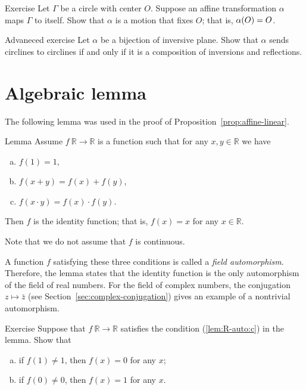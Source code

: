 \begin{thm}{Exercise}\label{ex:preserved-circle}
Let $\Gamma$ be a circle with center $O$.
Suppose an affine transformation $\alpha$ maps $\Gamma$ to itself.
Show that $\alpha$ is a motion that fixes $O$;
that is, $\alpha(O)=O$.
\end{thm}


\begin{thm}{Advaneced exercise}\label{ex:inversions-inversive}
Let $\alpha$ be a bijection of inversive plane.
Show that $\alpha$ sends circlines to circlines if and only if it is a composition of inversions and reflections.
\end{thm}



\section{Algebraic lemma}

The following lemma was used in the proof of Proposition~\ref{prop:affine-linear}.

\begin{thm}{Lemma}\label{lem:R-auto}
Assume $f\:\mathbb{R}\to\mathbb{R}$ is a function such that for any $x,y\in\mathbb{R}$ we have
\begin{enumerate}[(a)]
\item\label{lem:R-auto:a} $f(1)=1$,
\item\label{lem:R-auto:b} $f(x+y)=f(x)+f(y)$,
\item\label{lem:R-auto:c} $f(x\cdot y)=f(x)\cdot f(y)$.
\end{enumerate}

Then $f$ is the identity function; that is,
$f(x)=x$ for any $x\in \mathbb{R}$.
\end{thm}

Note that we do not assume that $f$ is continuous.

A function $f$ satisfying these three conditions
is called a \emph{field automorphism}.
Therefore, the lemma states that the identity function is the only automorphism of the field of real numbers.
For the field of complex numbers, the conjugation $z\mapsto\bar z$ (see Section~\ref{sec:complex-conjugation}) gives an example of a nontrivial automorphism.

\begin{thm}{Exercise}\label{ex:f(1)=1}
Suppose that $f\:\mathbb{R}\to\mathbb{R}$ satisfies the condition (\ref{lem:R-auto:c}) in the lemma.
Show that 
\begin{enumerate}[(a)]
 \item if $f(1)\ne 1$, then $f(x)=0$ for any $x$;
  \item if $f(0)\ne 0$, then $f(x)=1$ for any $x$.
\end{enumerate}
\end{thm}


